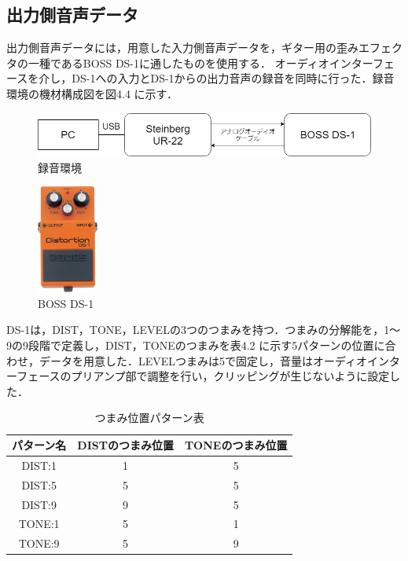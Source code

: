 \documentclass{jreport}		%
\begin{document}
\subsection{出力側音声データ}
出力側音声データには，用意した入力側音声データを，ギター用の歪みエフェクタの一種であるBOSS DS-1に通したものを使用する．
オーディオインターフェースを介し，DS-1への入力とDS-1からの出力音声の録音を同時に行った．録音環境の機材構成図を図4.4 に示す．

\begin{figure}[htbp]
 \begin{center}
  \includegraphics[width=120mm]{env.png}
 \end{center}
 \caption{録音環境}
 \label{fig:one}
\end{figure}

\begin{figure}[htbp]
 \begin{center}
  \includegraphics[width=20mm]{ds1.jpg}
 \end{center}
 \caption{BOSS DS-1}
 \label{fig:one}
\end{figure}

DS-1は，DIST，TONE，LEVELの3つのつまみを持つ．つまみの分解能を，1～9の9段階で定義し，DIST，TONEのつまみを表4.2 に示す5パターンの位置に合わせ，データを用意した．LEVELつまみは5で固定し，音量はオーディオインターフェースのプリアンプ部で調整を行い，クリッピングが生じないように設定した．

\begin{table}
  \begin{center}
  \caption{つまみ位置パターン表}
  \begin{tabular}{c|cc} \hline
    パターン名&DISTのつまみ位置&TONEのつまみ位置\\ \hline
    DIST:1&1&5 \\
    DIST:5&5&5 \\
    DIST:9&9&5 \\
    TONE:1&5&1 \\
    TONE:9&5&9 \\ \hline
  \end{tabular}
  \end{center}
\end{table}
\end{document}
